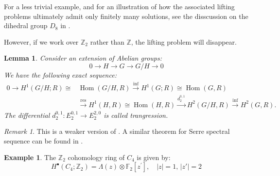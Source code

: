 \documentclass[a4paper,11pt]{article}
\newtheorem{lemma}[theorem]{Lemma}
\theoremstyle{definition}
\newtheorem{example}[theorem]{Example}
\theoremstyle{remark}
\newtheorem{remark}[theorem]{Remark}
\begin{document}
For a less trivial example, and for an illustration of how the associated lifting problems ultimately admit only finitely many solutions, see the disscussion on the dihedral group $D_8$ in \cite[Example 6.4]{ramos2017spectralsequencesexamples}.

However, if we work over $\mathbb{Z}_2$ rather than $\mathbb{Z}$, the lifting problem will disappear. 
\begin{lemma}
	\label{tran}
	Consider an extension of Abelian groups:
	\[
	0\to H\to G\to G/H\to 0
	\]
	We have the following exact sequence:
	\begin{equation}
		\label{five}
		\begin{aligned}
			0\to H^1(G/H;R)\cong &\operatorname{Hom}(G/H,R)\xrightarrow{\mathrm{inf}}H^1(G;R)\cong \operatorname{Hom}(G,R)\\&\xrightarrow{\mathrm{res}}H^1(H,R)\cong\operatorname{Hom}(H,R)\xrightarrow{d_2^{0,1}}H^2(G/H,R)\xrightarrow{\inf}H^2(G,R).
		\end{aligned}
	\end{equation}
	The differential $d^{0,1}_2:E_2^{0,1}\to E_2^{2,0}$ is called {\itshape trangression}.
\end{lemma}
\begin{remark}
	This is a weaker version of \cite[Corollary 7.2.3]{evens1991cohomology}. A similar theorem for Serre spectral sequence can be found in \cite[Theorem 9.13]{davis2001lecture}.
\end{remark}
\begin{example} The $\mathbb{Z}_2$ cohomology ring of $C_4$ is given by:
	\[
	H^\bullet(C_4;\mathbb{Z}_2)=\Lambda(z)\otimes{\mathbb{F}_2[z^{\prime}]},\quad |z|=1,\, |z'|=2
	\]
\end{example}
\end{document}
